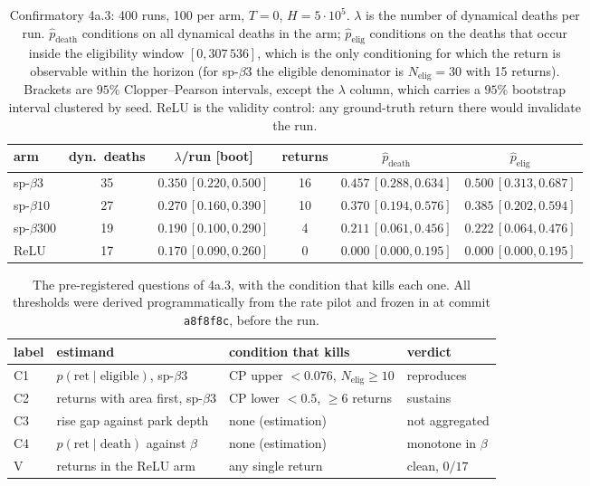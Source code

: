 \documentclass[11pt]{article}
\theoremstyle{definition}
\theoremstyle{remark}
\begin{document}
\begin{table}[t]
\centering
\caption{Confirmatory 4a.3: 400 runs, 100 per arm, $T=0$, $H=5\cdot10^{5}$.
$\lambda$ is the number of dynamical deaths per run.
$\hat p_{\mathrm{death}}$ conditions on all dynamical deaths in the arm;
$\hat p_{\mathrm{elig}}$ conditions on the deaths that occur inside the
eligibility window $[0,307\,536]$, which is the only conditioning for which the
return is observable within the horizon (for sp-$\beta3$ the eligible denominator
is $N_{\mathrm{elig}}=30$ with 15 returns). Brackets are $95\%$ Clopper--Pearson
intervals, except the $\lambda$ column, which carries a $95\%$ bootstrap interval
clustered by seed. ReLU is the validity control: any ground-truth return there
would invalidate the run.}
\label{tab:4a3}
\small
\begin{tabular}{@{}lccccc@{}}
\toprule
arm & dyn.\ deaths & $\lambda$/run [boot] & returns & $\hat
p_{\mathrm{death}}$ & $\hat p_{\mathrm{elig}}$ \\
\midrule
sp-$\beta3$   & 35 & $0.350\,[0.220,0.500]$ & 16 & $0.457\,[0.288,0.634]$ &
$0.500\,[0.313,0.687]$ \\
sp-$\beta10$  & 27 & $0.270\,[0.160,0.390]$ & 10 & $0.370\,[0.194,0.576]$ &
$0.385\,[0.202,0.594]$ \\
sp-$\beta300$ & 19 & $0.190\,[0.100,0.290]$ & 4  & $0.211\,[0.061,0.456]$ &
$0.222\,[0.064,0.476]$ \\
ReLU          & 17 & $0.170\,[0.090,0.260]$ & 0  & $0.000\,[0.000,0.195]$ &
$0.000\,[0.000,0.195]$ \\
\bottomrule
\end{tabular}
\end{table}

\begin{table}[t]
\centering
\caption{The pre-registered questions of 4a.3, with the condition that kills each
one. All thresholds were derived programmatically from the rate pilot and frozen
in \protect{} at commit \texttt{a8f8f8c}, before the run.}
\label{tab:preregistered}
\small
\begin{tabular}{@{}llll@{}}
\toprule
label & estimand & condition that kills & verdict \\
\midrule
C1 & $p(\mathrm{ret}\mid\mathrm{eligible})$, sp-$\beta3$
   & CP upper $<0.076$, $N_{\mathrm{elig}}\ge10$ & reproduces \\
C2 & returns with area first, sp-$\beta3$
   & CP lower $<0.5$, $\ge6$ returns & sustains \\
C3 & rise gap against park depth
   & none (estimation) & not aggregated \\
C4 & $p(\mathrm{ret}\mid\mathrm{death})$ against $\beta$
   & none (estimation) & monotone in $\beta$ \\
V  & returns in the ReLU arm
   & any single return & clean, $0/17$ \\
\bottomrule
\end{tabular}
\end{table}
\end{document}
